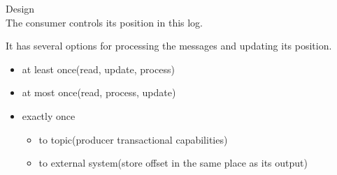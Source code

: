 \begin{frame}[plain,t]{Design} %
     \\
    \vspace{2ex}
    The consumer controls its position in this log. 
    
    \vspace{2ex}
    It has several options for processing the messages and updating its position.
    
    \vspace{2ex}
    \begin{itemize}
        \item at least once(read, update, process)
        \item at most once(read, process, update)
        \item exactly once
        \begin{itemize}
            \item to topic(producer transactional capabilities)
            \item to external system(store offset in the same place as its output)
            
        \end{itemize}
    \end{itemize}
    
    
    
\end{frame}
